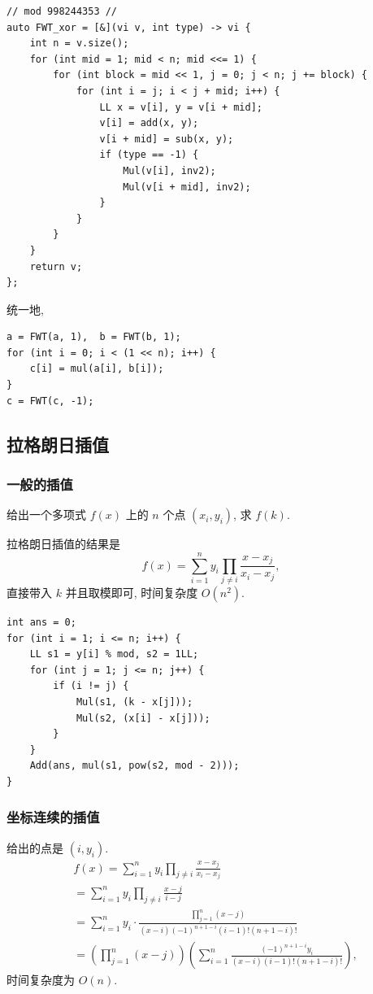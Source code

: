\documentclass[UTF8, a4paper, titlepage, twoside]{ctexart}
\begin{document}
\begin{lstlisting}[style=cpp]
// mod 998244353 //
auto FWT_xor = [&](vi v, int type) -> vi {
    int n = v.size();
    for (int mid = 1; mid < n; mid <<= 1) {
        for (int block = mid << 1, j = 0; j < n; j += block) {
            for (int i = j; i < j + mid; i++) {
                LL x = v[i], y = v[i + mid];
                v[i] = add(x, y);
                v[i + mid] = sub(x, y);
                if (type == -1) {
                    Mul(v[i], inv2);
                    Mul(v[i + mid], inv2);
                }
            }
        }
    }
    return v;
};	
\end{lstlisting}

统一地, 

\begin{lstlisting}[style=cpp]
a = FWT(a, 1),  b = FWT(b, 1);
for (int i = 0; i < (1 << n); i++) {
    c[i] = mul(a[i], b[i]);
}
c = FWT(c, -1);
\end{lstlisting}
\subsection{ 拉格朗日插值 }

\subsubsection{ 一般的插值 }
给出一个多项式 $f(x)$ 上的 $n$ 个点 $(x_i, y_i)$, 求 $f(k)$.

拉格朗日插值的结果是
$$
f(x) = \sum_{i=1}^{n} y_i \prod_{j \neq i} \frac{x - x_j}{x_i - x_j},
$$
直接带入 $k$ 并且取模即可, 时间复杂度 $O(n^2)$.

\begin{lstlisting}[style=cpp]
int ans = 0;
for (int i = 1; i <= n; i++) {
    LL s1 = y[i] % mod, s2 = 1LL;
    for (int j = 1; j <= n; j++) {
        if (i != j) {
            Mul(s1, (k - x[j]));
            Mul(s2, (x[i] - x[j]));
        }
    }
    Add(ans, mul(s1, pow(s2, mod - 2)));
}
\end{lstlisting}

\subsubsection{ 坐标连续的插值 }
给出的点是 $(i, y_i)$.
$$
\begin{aligned}
& f(x) = \sum_{i=1}^{n} y_i \prod_{j \neq i} \frac{x - x_j}{x_i - x_j} \\
& = \sum_{i=1}^{n} y_i \prod_{j \neq i} \frac{x - j}{i - j} \\
& = \sum_{i=1}^{n} y_i \cdot \frac{\prod\limits_{j=1}^n (x - j)}{(x - i) (-1)^{n+1-i}(i-1)!(n+1-i)!} \\
& = \left( \prod_{j=1}^n (x - j) \right) \left(\sum_{i=1}^n \frac{(-1)^{n+1-i}y_i}{(x-i)(i-1)!(n+1-i)!}\right),
\end{aligned}
$$
时间复杂度为 $O(n)$.
\end{document}

